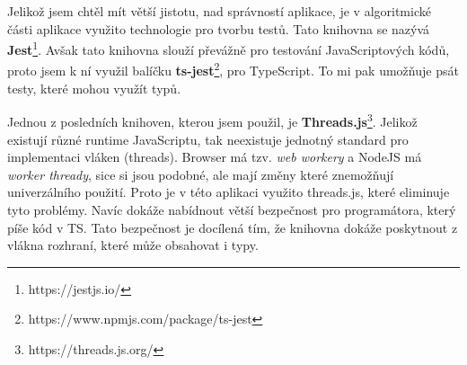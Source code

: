 Jelikož jsem chtěl mít větší jistotu, nad správností aplikace, je v algoritmické části aplikace využito technologie pro tvorbu testů. 
Tato knihovna se nazývá \textbf{Jest}\footnote{https://jestjs.io/}.
Avšak tato knihovna slouží převážně pro testování JavaScriptových kódů, proto jsem k ní využil balíčku \textbf{ts-jest}\footnote{https://www.npmjs.com/package/ts-jest}, pro TypeScript.
To mi pak umožňuje psát testy, které mohou využít typů.

Jednou z posledních knihoven, kterou jsem použil, je \textbf{Threads.js}\footnote{https://threads.js.org/}. 
Jelikož existují různé runtime JavaScriptu, tak neexistuje jednotný standard pro implementaci vláken (threads).
Browser má tzv. \textit{web workery} a NodeJS má \textit{worker thready}, sice si jsou podobné, ale mají změny které znemožňují univerzálního použití.
Proto je v této aplikaci využito threads.js, které eliminuje tyto problémy.
Navíc dokáže nabídnout větší bezpečnost pro programátora, který píše kód v TS. 
Tato bezpečnost je docílená tím, že knihovna dokáže poskytnout z vlákna rozhraní, které může obsahovat i typy.

\endinput